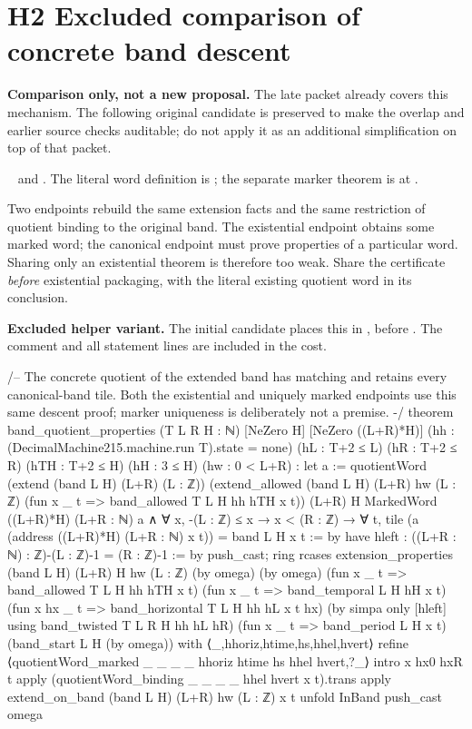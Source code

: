 \section{H2 Excluded comparison of concrete band descent}

\textbf{Comparison only, not a new proposal.} The late packet already covers this mechanism. The following original candidate is preserved to make the overlap and earlier source checks auditable; do not apply it as an additional simplification on top of that packet.

\  and . The literal word definition is ; the separate marker theorem is at .

Two endpoints rebuild the same extension facts and the same restriction of quotient binding to the original band. The existential endpoint obtains some marked word; the canonical endpoint must prove properties of a particular word. Sharing only an existential theorem is therefore too weak. Share the certificate \emph{before} existential packaging, with the literal existing quotient word in its conclusion.

\textbf{Excluded helper variant.} The initial candidate places this in , before . The comment and all statement lines are included in the cost.
\begin{Lean}
/-- The concrete quotient of the extended band has matching and retains every
canonical-band tile. Both the existential and uniquely marked endpoints use this
same descent proof; marker uniqueness is deliberately not a premise. -/
theorem band_quotient_properties (T L R H : ℕ) [NeZero H]
    [NeZero ((L+R)*H)]
    (hh : (DecimalMachine215.machine.run T).state = none)
    (hL : T+2 ≤ L) (hR : T+2 ≤ R) (hTH : T+2 ≤ H) (hH : 3 ≤ H)
    (hw : 0 < L+R) :
    let a := quotientWord (extend (band L H) (L+R) (L : ℤ))
      (extend_allowed (band L H) (L+R) hw (L : ℤ)
        (fun x _ t => band_allowed T L H hh hTH x t)) (L+R) H
    MarkedWord ((L+R)*H) (L+R : ℕ) a ∧
      ∀ x, -(L : ℤ) ≤ x → x < (R : ℤ) → ∀ t,
        tile (a (address ((L+R)*H) (L+R : ℕ) x t)) = band L H x t := by
  have hleft : ((L+R : ℕ) : ℤ)-(L : ℤ)-1 = (R : ℤ)-1 := by push_cast; ring
  rcases extension_properties (band L H) (L+R) H hw (L : ℤ) (by omega) (by omega)
      (fun x _ t => band_allowed T L H hh hTH x t)
      (fun x _ t => band_temporal L H hH x t)
      (fun x hx _ t => band_horizontal T L H hh hL x t hx)
      (by simpa only [hleft] using band_twisted T L R H hh hL hR)
      (fun x _ t => band_period L H x t) (band_start L H (by omega)) with
    ⟨_,hhoriz,htime,hs,hhel,hvert⟩
  refine ⟨quotientWord_marked _ _ _ _ hhoriz htime hs hhel hvert,?_⟩
  intro x hx0 hxR t
  apply (quotientWord_binding _ _ _ _ hhel hvert x t).trans
  apply extend_on_band (band L H) (L+R) hw (L : ℤ) x t
  unfold InBand
  push_cast
  omega
\end{Lean}

